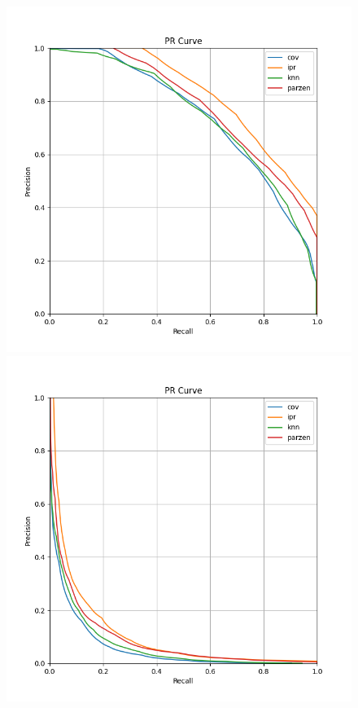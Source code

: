 \begin{figure}[h!]
    \includegraphics[width=\linewidth]{../images/toyexperiments/prcurves/PRCurve_ksqrt_s1.png} 
    \includegraphics[width=\linewidth]{../images/toyexperiments/prcurves/PRCurve_ksqrt_s3.png} 

\end{figure}
